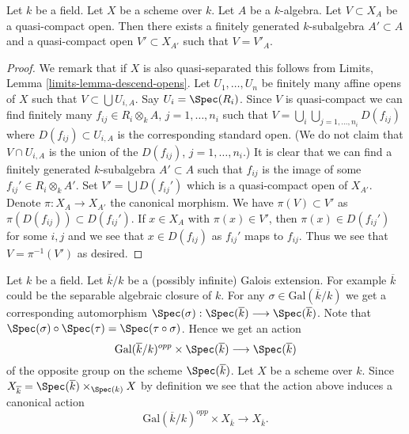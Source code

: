 \begin{lemma}
\label{lemma-descend-open}
Let $k$ be a field.
Let $X$ be a scheme over $k$.
Let $A$ be a $k$-algebra.
Let $V \subset X_A$ be a quasi-compact open.
Then there exists a finitely generated $k$-subalgebra $A' \subset A$
and a quasi-compact open $V' \subset X_{A'}$
such that $V = V'_A$.
\end{lemma}

\begin{proof}
We remark that if $X$ is also quasi-separated this follows from
Limits, Lemma \ref{limits-lemma-descend-opens}. Let
$U_1, \ldots, U_n$ be finitely many affine opens of $X$
such that $V \subset \bigcup U_{i, A}$. Say $U_i = \Spec(R_i)$.
Since $V$ is quasi-compact we can find finitely many
$f_{ij} \in R_i \otimes_k A$, $j = 1, \ldots, n_i$
such that $V = \bigcup_i \bigcup_{j = 1, \ldots, n_i} D(f_{ij})$
where $D(f_{ij}) \subset U_{i, A}$ is the corresponding standard
open. (We do not claim that $V \cap U_{i, A}$ is the union
of the $D(f_{ij})$, $j = 1, \ldots, n_i$.)
It is clear that we can find a finitely generated $k$-subalgebra
$A' \subset A$ such that $f_{ij}$ is the image of some
$f_{ij}' \in R_i \otimes_k A'$.
Set $V' = \bigcup D(f_{ij}')$ which is a quasi-compact open of $X_{A'}$.
Denote $\pi : X_A \to X_{A'}$ the canonical morphism.
We have $\pi(V) \subset V'$ as $\pi(D(f_{ij})) \subset D(f_{ij}')$.
If $x \in X_A$ with $\pi(x) \in V'$, then $\pi(x) \in D(f_{ij}')$
for some $i, j$ and we see that $x \in D(f_{ij})$ as $f_{ij}'$
maps to $f_{ij}$. Thus we see that $V = \pi^{-1}(V')$ as desired.
\end{proof}

\noindent
Let $k$ be a field. Let $\overline{k}/k$ be a (possibly infinite)
Galois extension. For example $\overline{k}$ could be the
separable algebraic closure of $k$.
For any $\sigma \in \text{Gal}(\overline{k}/k)$ we get a corresponding
automorphism
$
\Spec(\sigma) :
\Spec(\overline{k})
\longrightarrow
\Spec(\overline{k})
$.
Note that
$\Spec(\sigma) \circ \Spec(\tau) = \Spec(\tau \circ \sigma)$.
Hence we get an action
$$
\text{Gal}(\overline{k}/k)^{opp} \times \Spec(\overline{k})
\longrightarrow
\Spec(\overline{k})
$$
of the opposite group on the scheme $\Spec(\overline{k})$.
Let $X$ be a scheme over $k$. Since
$X_{\overline{k}} =
\Spec(\overline{k}) \times_{\Spec(k)} X$
by definition we see that the action above induces a canonical action
\begin{equation}
\label{equation-galois-action-base-change-kbar}
\text{Gal}(\overline{k}/k)^{opp} \times X_{\overline{k}}
\longrightarrow
X_{\overline{k}}.
\end{equation}

